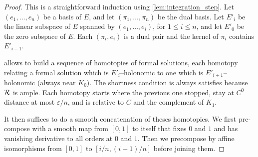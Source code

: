\begin{proof}
  \leanok
  This is a straightforward induction using \cref{lem:integration_step}.
  Let $(e_1, \dots, e_n)$ be a basis of $E$,
  and let $(π_1, \dots, π_n)$ be the dual basis.
  Let $E'_i$ be the linear subspace of $E$ spanned by
  $(e_1, \dots, e_i)$, for $1 ≤ i ≤ n$, and let $E'_0$ be the zero
  subspace of $E$.
  Each $(π_i, e_i)$ is a dual pair and the kernel of $π_i$ contains
  $E'_{i - 1}$.

   allows to build a sequence of homotopies
  of formal solutions,
  each homotopy relating a formal solution which is $E'_i$--holonomic to
  one which is $E'_{i+1}$--holonomic (always near $K_0$).
  The shortness condition is always satisfies because $\mathcal{R}$ is
  ample.
  Each homotopy starts where the previous one stopped, stay at
  $C^0$ distance at most $ε/n$, and is relative to $C$ and
  the complement of $K_1$.

  It then suffices to do a smooth concatenation of theses homotopies.
  We first pre-compose with a smooth map from $[0, 1]$ to itself that
  fixes $0$ and $1$ and has vanishing derivative to all orders at $0$
  and $1$.
  Then we precompose by affine isomorphisms from $[0, 1]$
  to $[i/n, (i + 1)/n]$ before joining them.
\end{proof}


